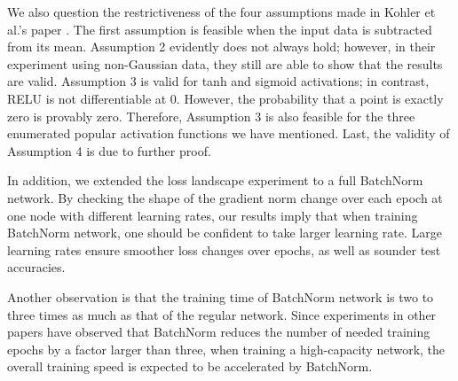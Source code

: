 \documentclass{article}
\begin{document}
We also question the restrictiveness of the four assumptions made in Kohler et al.'s paper \cite{decoupling}. The first assumption is feasible when the input data is subtracted from its mean. Assumption 2 evidently does not always hold; however, in their experiment using non-Gaussian data, they still are able to show that the results are valid. Assumption 3 is valid for tanh and sigmoid activations; in contrast, RELU is not differentiable at 0. However, the probability that a point is exactly zero is provably zero. Therefore, Assumption 3 is also feasible for the three enumerated popular activation functions we have mentioned. Last, the validity of Assumption 4 is due to further proof. 

In addition, we extended the loss landscape experiment to a full BatchNorm network. By checking the shape of the gradient norm change over each epoch at one node with different learning rates, our results imply that when training BatchNorm network, one should be confident to take larger learning rate. Large learning rates ensure smoother loss changes over epochs, as well as sounder test accuracies.

Another observation is that the training time of BatchNorm network is two to three times as much as that of the regular network. Since experiments in other papers have observed that BatchNorm reduces the number of needed training epochs by a factor larger than three, when training a high-capacity network, the overall training speed is expected to be accelerated by BatchNorm.
\end{document}
